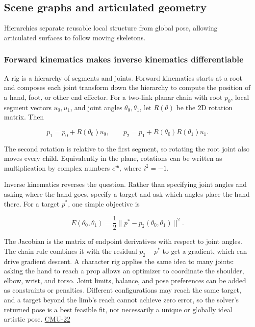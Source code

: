 \subsection{Scene graphs and articulated geometry}\label{scene-graphs-and-articulated-geometry}

Hierarchies separate reusable local structure from global pose, allowing articulated surfaces to follow moving skeletons.

\subsubsection{Forward kinematics makes inverse kinematics differentiable}\label{forward-kinematics-makes-inverse-kinematics-differentiable}

A rig is a hierarchy of segments and joints. Forward kinematics starts at a root and composes each joint transform down the hierarchy to compute the position of a hand, foot, or other end effector. For a two-link planar chain with root \(p_0\), local segment vectors \(u_0,u_1\), and joint angles \(\theta_0,\theta_1\), let \(R(\theta)\) be the 2D rotation matrix. Then

\[
p_1=p_0+R(\theta_0)u_0,\qquad
p_2=p_1+R(\theta_0)R(\theta_1)u_1.
\]

The second rotation is relative to the first segment, so rotating the root joint also moves every child. Equivalently in the plane, rotations can be written as multiplication by complex numbers \(e^{i\theta}\), where \(i^2=-1\).

Inverse kinematics reverses the question. Rather than specifying joint angles and asking where the hand goes, specify a target and ask which angles place the hand there. For a target \(p^*\), one simple objective is

\[
E(\theta_0,\theta_1)=\frac12\|p^*-p_2(\theta_0,\theta_1)\|^2.
\]

The Jacobian is the matrix of endpoint derivatives with respect to joint angles. The chain rule combines it with the residual \(p_2-p^*\) to get a gradient, which can drive gradient descent. A character rig applies the same idea to many joints: asking the hand to reach a prop allows an optimizer to coordinate the shoulder, elbow, wrist, and torso. Joint limits, balance, and pose preferences can be added as constraints or penalties. Different configurations may reach the same target, and a target beyond the limb's reach cannot achieve zero error, so the solver's returned pose is a best feasible fit, not necessarily a unique or globally ideal artistic pose. \hyperref[04-visual-computing-ii-ch036]{CMU-22}

